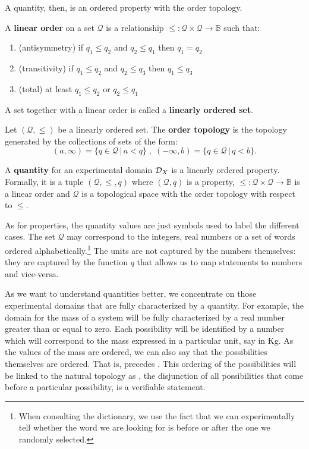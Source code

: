 \documentclass[11pt,letterpaper,fleqn]{memoir} %
\begin{document}
A quantity, then, is an ordered property with the order topology.

\begin{mathSection}
\begin{defn}
	A \textbf{linear order} on a set $\mathcal{Q}$ is a relationship $\leq : \mathcal{Q} \times \mathcal{Q} \to \mathbb{B}$ such that:
	\begin{enumerate}
		\item (antisymmetry) if $q_1 \leq q_2$ and $q_2 \leq q_1$ then $q_1 = q_2$
		\item (transitivity) if $q_1 \leq q_2$ and $q_2 \leq q_3$ then $q_1 \leq q_3$
		\item (total) at least $q_1 \leq q_2$ or $q_2 \leq q_1$
	\end{enumerate}
	A set together with a linear order is called a \textbf{linearly ordered set}.
\end{defn}
\begin{defn}
	Let $(\mathcal{Q}, \leq )$ be a linearly ordered set. The \textbf{order topology} is the topology generated by the collections of sets of the form:
	$$(a, \infty) = \{q \in \mathcal{Q} \, | \, a < q\} \;,\; (-\infty, b) = \{q \in \mathcal{Q} \, | \, q < b\}.$$
\end{defn}
\begin{defn}
	A \textbf{quantity} for an experimental domain $\mathcal{D}_X$ is a linearly ordered property. Formally, it is a tuple $(\mathcal{Q}, \leq, q)$ where $(\mathcal{Q}, q)$ is a property, $\leq : \mathcal{Q} \times \mathcal{Q} \to \mathbb{B}$ is a linear order and $\mathcal{Q}$ is a topological space with the order topology with respect to $\leq$.
\end{defn}
\end{mathSection}

As for properties, the quantity values are just symbols used to label the different cases. The set $\mathcal{Q}$ may correspond to the integers, real numbers or a set of words ordered alphabetically.\footnote{When consulting the dictionary, we use the fact that we can experimentally tell whether the word we are looking for is before or after the one we randomly selected.} The units are not captured by the numbers themselves: they are captured by the function $q$ that allows us to map statements to numbers and vice-versa.

As we want to understand quantities better, we concentrate on those experimental domains that are fully characterized by a quantity. For example, the domain for the mass of a system will be fully characterized by a real number greater than or equal to zero. Each possibility will be identified by a number which will correspond to the mass expressed in a particular unit, say in Kg. As the values of the mass are ordered, we can also say that the possibilities themselves are ordered. That is,  precedes . This ordering of the possibilities will be linked to the natural topology as , the disjunction of all possibilities that come before a particular possibility, is a verifiable statement.
\end{document}
